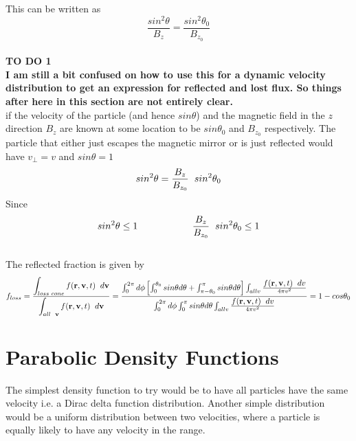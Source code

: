 \documentclass[12pt]{article}
\begin{document}
{	\noindent This can be written as
	$$ \frac{sin^{2}\theta}{B_{z}} =  \frac{sin^{2}\theta_{0}}{B_{z_{0}}} $$ \\
	
	\color{blue}
	\textbf{TO DO 1} \\
	\color{red} 
	\textbf{I am still a bit confused on how to use this for a dynamic velocity distribution to get an expression for reflected and lost flux. So things after here in this section are not entirely clear.}
	\color{black}\\
	
	if the velocity of the particle (and hence $sin\theta$) and the magnetic field in the $z$ direction $B_{z}$ are known at some location to be $sin\theta_{0}$ and $B_{z_{0}}$ respectively.
	The particle that either just escapes the magnetic mirror or is just reflected would have $ v_{\perp} = v $ and $ sin\theta = 1 $ $$ sin^{2}\theta = \frac{B_{z}}{B_{z_{0}}} \hspace{0.2cm} sin^{2}\theta_{0}$$
	Since $$ sin^{2}\theta \leq 1 \hspace{2cm} \frac{B_{z}}{B_{z_{0}}} \hspace{0.2cm} sin^{2}\theta_{0} \leq 1$$\\
	
	\noindent The reflected fraction is given by 
	$$ f_{loss} = \frac{\displaystyle \int_{loss \hspace{0.1cm} cone}^{} f(\textbf{r}, \textbf{v}, t)  \hspace{0.2 cm} d \textbf{v}}{\displaystyle \int_{all \hspace{0.2 cm}\textbf{v}}^{} f(\textbf{r}, \textbf{v}, t) \hspace{0.2 cm} d \textbf{v}} = \frac{\int_{0}^{2 \pi} d \phi \left[ \int_{0}^{\theta_{0}} sin \theta d \theta + \int_{\pi - \theta_{0}}^{\pi} sin \theta d \theta \right] \int_{all v}^{} \frac{\displaystyle  f(\textbf{r}, \textbf{v}, t)  \hspace{0.2 cm} dv}{4 \pi v^{2}}}{\int_{0}^{2 \pi} d \phi \int_{0}^{\pi} sin \theta d \theta \int_{all v}^{} \frac{\displaystyle  f(\textbf{r}, \textbf{v}, t)  \hspace{0.2 cm} dv}{4 \pi v^{2}}} = 1 - cos\theta_{0}$$
	
\section{Parabolic Density Functions}
	The simplest density function to try would be to have all particles have the same velocity i.e. a Dirac delta function distribution. Another simple distribution would be a uniform distribution between two velocities, where a particle is equally likely to have any velocity in the range.
	
}
\end{document}
